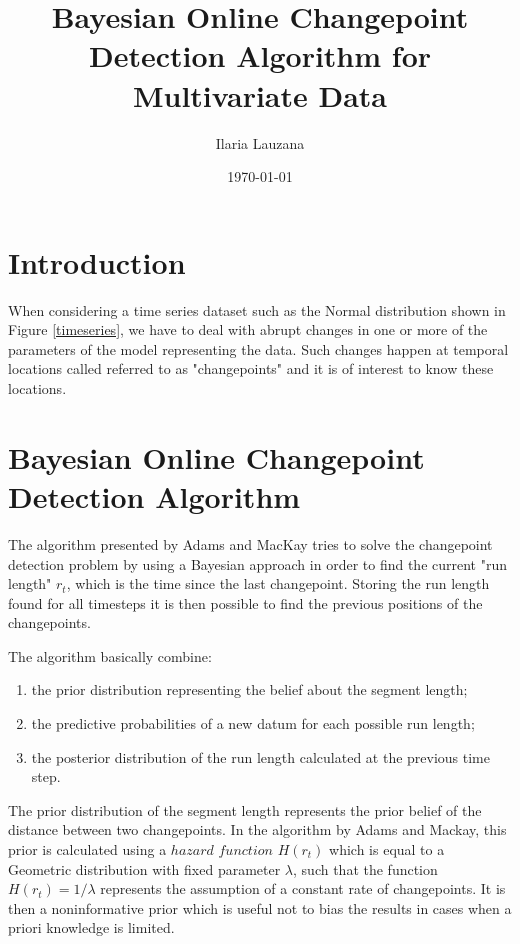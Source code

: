 \documentclass[a4paper]{article}
\title{\textbf{Bayesian Online Changepoint Detection Algorithm for Multivariate Data}}
\author{Ilaria Lauzana}
\date{\today}
\begin{document}
\maketitle
\clearpage

\tableofcontents

\newpage

\section{Introduction}

When considering a time series dataset such as the Normal distribution shown in Figure \ref{timeseries}, we have to deal with abrupt changes in one or more of the parameters of the model representing the data. Such changes happen at temporal locations called referred to as "changepoints" and it is of interest to know these locations. 

\newpage

\section{Bayesian Online Changepoint Detection Algorithm}

The algorithm presented by Adams and MacKay tries to solve the changepoint detection problem by using a Bayesian approach in order to find the current "run length" $r_t$, which is the time since the last changepoint. Storing the run length found for all timesteps it is then possible to find the previous positions of the changepoints. 

The algorithm basically combine:
\begin{enumerate}
\item the prior distribution representing the belief about the segment length;
\item the predictive probabilities of a new datum for each possible run length;
\item the posterior distribution of the run length calculated at the previous time step.
\end{enumerate}

The prior distribution of the segment length represents the prior belief of the distance between two changepoints. In the algorithm by Adams and Mackay, this prior is calculated using a $hazard$ $function$ $H(r_t)$ which is equal to a Geometric distribution with fixed parameter $\lambda$, such that the function $H(r_t) = 1/\lambda$ represents the assumption of a constant rate of changepoints. It is then a noninformative prior which is useful not to bias the results in cases when a priori knowledge is limited.
\end{document}

